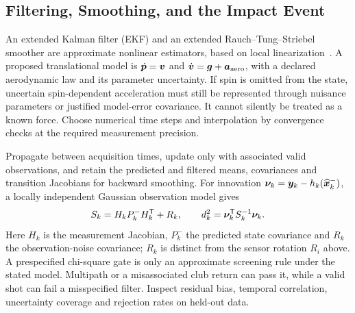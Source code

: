 \subsection{Filtering, Smoothing, and the Impact Event}

An extended Kalman filter (EKF) and an extended Rauch--Tung--Striebel smoother are approximate nonlinear estimators, based on local linearization~\cite{sarkkasvensson2023}.
A proposed translational model is $\dot{\bm{p}}=\bm{v}$ and $\dot{\bm{v}}=\bm{g}+\bm{a}_{\rm aero}$, with a declared aerodynamic law and its parameter uncertainty.
If spin is omitted from the state, uncertain spin-dependent acceleration must still be represented through nuisance parameters or justified model-error covariance.
It cannot silently be treated as a known force.
Choose numerical time steps and interpolation by convergence checks at the required measurement precision.

Propagate between acquisition times, update only with associated valid observations, and retain the predicted and filtered means, covariances and transition Jacobians for backward smoothing.
For innovation $\bm{\nu}_k=\bm{y}_k-h_k(\widehat{\bm{x}}_k^-)$, a locally independent Gaussian observation model gives
\begin{equation}
S_k=H_kP_k^-H_k^{\mathsf T}+R_k,
\qquad d_k^2=\bm{\nu}_k^{\mathsf T}S_k^{-1}\bm{\nu}_k.
\label{eq:implinnovation}
\end{equation}
Here $H_k$ is the measurement Jacobian, $P_k^-$ the predicted state covariance and $R_k$ the observation-noise covariance; $R_k$ is distinct from the sensor rotation $R_i$ above.
A prespecified chi-square gate is only an approximate screening rule under the stated model.
Multipath or a misassociated club return can pass it, while a valid shot can fail a misspecified filter.
Inspect residual bias, temporal correlation, uncertainty coverage and rejection rates on held-out data.

